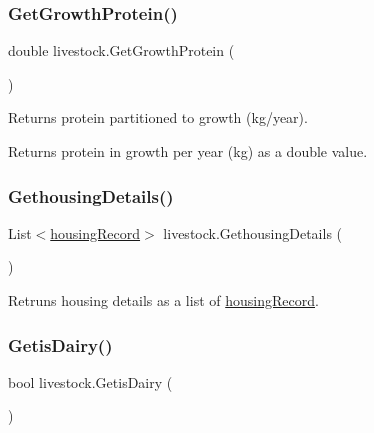 \mbox{\label{classlivestock_a041d8fd0f88b5c6c017135632867efc5}} 
\subsubsection{\texorpdfstring{GetGrowthProtein()}{GetGrowthProtein()}}
{\footnotesize\ttfamily double livestock.\+Get\+Growth\+Protein (\begin{DoxyParamCaption}{ }\end{DoxyParamCaption})\hspace{0.3cm}{\ttfamily [inline]}}



Returns protein partitioned to growth (kg/year). 

\begin{DoxyReturn}{Returns}
protein in growth per year (kg) as a double value. 
\end{DoxyReturn}
\mbox{\label{classlivestock_aa3e2e6b89d7fc483057d72a2a9a9d742}} 
\subsubsection{\texorpdfstring{GethousingDetails()}{GethousingDetails()}}
{\footnotesize\ttfamily List$<$\mbox{\hyperlink{structlivestock_1_1housing_record}{housing\+Record}}$>$ livestock.\+Gethousing\+Details (\begin{DoxyParamCaption}{ }\end{DoxyParamCaption})\hspace{0.3cm}{\ttfamily [inline]}}



Retruns housing details as a list of \mbox{\hyperlink{structlivestock_1_1housing_record}{housing\+Record}}. 

\mbox{\label{classlivestock_a1c4aab24ce56140e9c81ea03037c7f61}} 
\subsubsection{\texorpdfstring{GetisDairy()}{GetisDairy()}}
{\footnotesize\ttfamily bool livestock.\+Getis\+Dairy (\begin{DoxyParamCaption}{ }\end{DoxyParamCaption})\hspace{0.3cm}{\ttfamily [inline]}}



